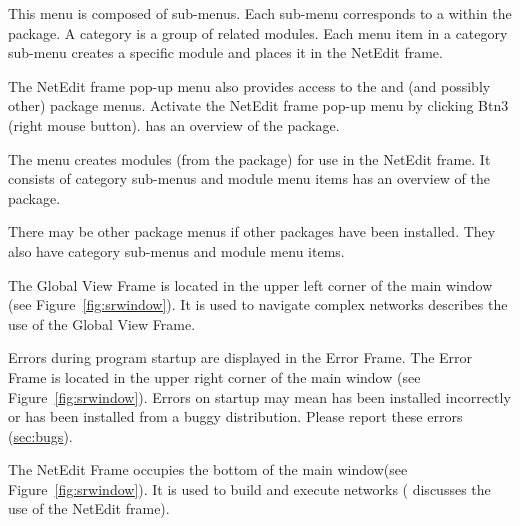 \begin{description}
\begin{description}
    This menu is composed of sub-menus. Each sub-menu corresponds to
     a 
     within the \sr{} package.  A category is a group of
    related modules.  Each menu item in a category sub-menu creates a
    specific module and places it in the NetEdit frame.  
    
    The NetEdit frame pop-up menu  also
    provides access to the \menu{\sr{}} and \menu{\biopse{}} (and
    possibly other) package menus. Activate the NetEdit frame pop-up
    menu by clicking Btn3 (right mouse button).  has an overview of the
    \sr{} package.
  \end{description}

  \begin{description}
     The  menu creates modules (from the
    \biopse package) for use in the NetEdit frame.  It consists of
    category sub-menus and module menu items  has an overview of the \biopse{}package.
  \end{description}

  \begin{description}
     There may be other
    package menus if other packages have been installed.  They also
    have category sub-menus and module menu items.
  \end{description}
  
   The Global View Frame is located in the
  upper left corner of the main window (see
  Figure~\ref{fig:srwindow}). It is used to navigate complex networks
   describes the use of the Global View Frame.
  
   Errors during program startup are displayed
  in the Error Frame.  The Error Frame is located in the upper right
  corner of the main window (see Figure~\ref{fig:srwindow}).  Errors on
  startup may mean \sr{} has been installed incorrectly or has
  been installed from a buggy distribution.  Please report these
  errors (\hyperref{report}{see Section~}{)}{sec:bugs}).
  
   The NetEdit Frame occupies the bottom of
  the main window(see Figure~\ref{fig:srwindow}).  It is used to build
  and execute networks (
  discusses the use of the NetEdit frame).

\end{description}


